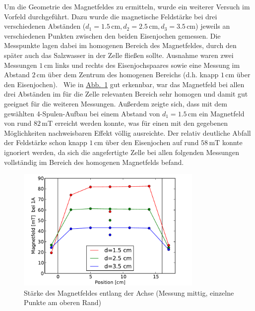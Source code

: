 \documentclass[11pt]{scrartcl}
\newcommand{\unit}[1]{\ensuremath{\,\mathrm{#1}}} %
\begin{document}
Um die Geometrie des Magnetfeldes zu ermitteln, wurde ein weiterer Versuch im Vorfeld durchgeführt. Dazu wurde die magnetische Feldstärke bei drei verschiedenen Abständen ($d_1=1.5 \unit{cm}, d_2=2.5 \unit{cm}, d_3=3.5 \unit{cm}$) jeweils an verschiedenen Punkten zwischen den beiden Eisenjochen gemessen. Die Messpunkte lagen dabei im homogenen Bereich des Magnetfeldes, durch den später auch das Salzwasser in der Zelle fließen sollte. Ausnahme waren zwei Messungen $1 \unit{cm}$ links und rechts des Eisenjochspaares sowie eine Messung im Abstand $2 \unit{cm}$ über dem Zentrum des homogenen Bereichs (d.h. knapp $1 \unit{cm}$ über den Eisenjochen). \
Wie in \hyperref[vormessung_magnetfeld]{Abb.~\ref{vormessung_magnetfeld}} gut erkennbar, war das Magnetfeld bei allen drei Abständen im für die Zelle relevanten Bereich sehr homogen und damit gut geeignet für die weiteren Messungen. Außerdem zeigte sich, dass mit dem gewählten 4-Spulen-Aufbau bei einem Abstand von $d_1=1.5 \unit{cm}$ ein Magnetfeld von rund $82 \unit{mT}$ erreicht werden konnte, was für einen mit den gegebenen Möglichkeiten nachweisbaren Effekt völlig ausreichte.
Der relativ deutliche Abfall der Feldstärke schon knapp $1 \unit{cm}$ über den Eisenjochen auf rund $58 \unit{mT}$ konnte ignoriert werden, da sich die angefertigte Zelle bei allen folgenden Messungen vollständig im Bereich des homogenen Magnetfelds befand. 

\begin{figure}[ht]
\begin{center}
\includegraphics[width=0.8\textwidth]{images/vormessung_magnetfeld.pdf}
\end{center}
\vspace{-1.5\baselineskip}
\caption{Stärke des Magnetfeldes entlang der Achse (Messung mittig, einzelne Punkte am oberen Rand)}
\label{vormessung_magnetfeld}
\end{figure}
\end{document}
